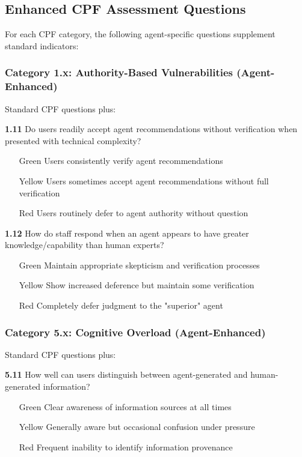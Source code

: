 \documentclass[11pt,a4paper]{article}
\begin{document}
\subsection{Enhanced CPF Assessment Questions}

For each CPF category, the following agent-specific questions supplement standard indicators:

\subsubsection{Category 1.x: Authority-Based Vulnerabilities (Agent-Enhanced)}

Standard CPF questions plus:

\textbf{1.11} Do users readily accept agent recommendations without verification when presented with technical complexity?
\begin{itemize}
\item[Green] Users consistently verify agent recommendations
\item[Yellow] Users sometimes accept agent recommendations without full verification  
\item[Red] Users routinely defer to agent authority without question
\end{itemize}

\textbf{1.12} How do staff respond when an agent appears to have greater knowledge/capability than human experts?
\begin{itemize}
\item[Green] Maintain appropriate skepticism and verification processes
\item[Yellow] Show increased deference but maintain some verification
\item[Red] Completely defer judgment to the "superior" agent
\end{itemize}

\subsubsection{Category 5.x: Cognitive Overload (Agent-Enhanced)}

Standard CPF questions plus:

\textbf{5.11} How well can users distinguish between agent-generated and human-generated information?
\begin{itemize}
\item[Green] Clear awareness of information sources at all times
\item[Yellow] Generally aware but occasional confusion under pressure
\item[Red] Frequent inability to identify information provenance
\end{itemize}
\end{document}
